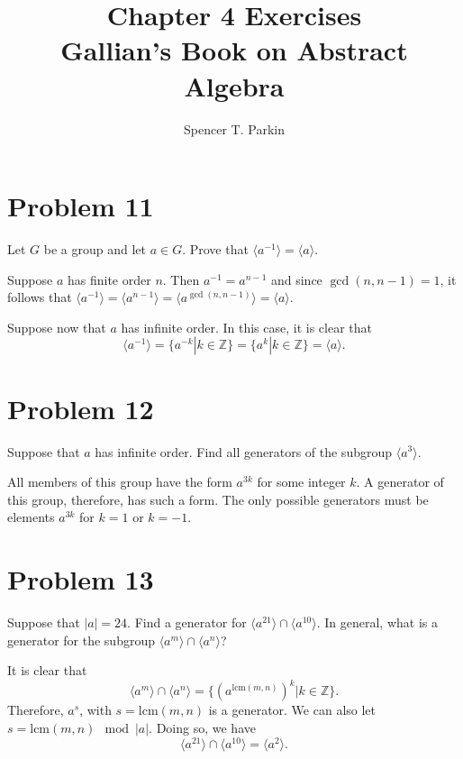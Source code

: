 \documentclass[12pt]{article}
\title{Chapter 4 Exercises\\Gallian's Book on Abstract Algebra}
\author{Spencer T. Parkin}
\newcommand{\lcm}{\mbox{lcm}}
\newcommand{\Z}{\mathbb{Z}}
\begin{document}
\maketitle

\section*{Problem 11}

Let $G$ be a group and let $a\in G$.  Prove that $\langle a^{-1}\rangle=\langle a\rangle$.

Suppose $a$ has finite order $n$.  Then $a^{-1}=a^{n-1}$ and
since $\gcd(n,n-1)=1$, it follows that $\langle a^{-1}\rangle=
\langle a^{n-1}\rangle=\langle a^{\gcd(n,n-1)}\rangle=\langle a\rangle$.

Suppose now that $a$ has infinite order.  In this case, it is clear that
\begin{equation*}
\langle a^{-1}\rangle=\{a^{-k}|k\in\Z\}=\{a^k|k\in\Z\}=\langle a\rangle.
\end{equation*}

\section*{Problem 12}

Suppose that $a$ has infinite order.  Find all generators of the subgroup $\langle a^3\rangle$.

All members of this group have the form $a^{3k}$ for some integer $k$.
A generator of this group, therefore, has such a form.  The only
possible generators must be elements $a^{3k}$ for $k=1$ or $k=-1$.

\section*{Problem 13}

Suppose that $|a|=24$.  Find a generator for $\langle a^{21}\rangle\cap\langle a^{10}\rangle$.
In general, what is a generator for the subgroup $\langle a^m\rangle\cap\langle a^n\rangle$?

It is clear that
\begin{equation*}
\langle a^m\rangle\cap\langle a^n\rangle=\{(a^{\lcm(m,n)})^k|k\in\Z\}.
\end{equation*}
Therefore, $a^s$, with $s=\lcm(m,n)$ is a generator.  We can also
let $s=\lcm(m,n)\mod |a|$.  Doing so, we have
\begin{equation*}
\langle a^{21}\rangle\cap\langle a^{10}\rangle = \langle a^2\rangle.
\end{equation*}
\end{document}

